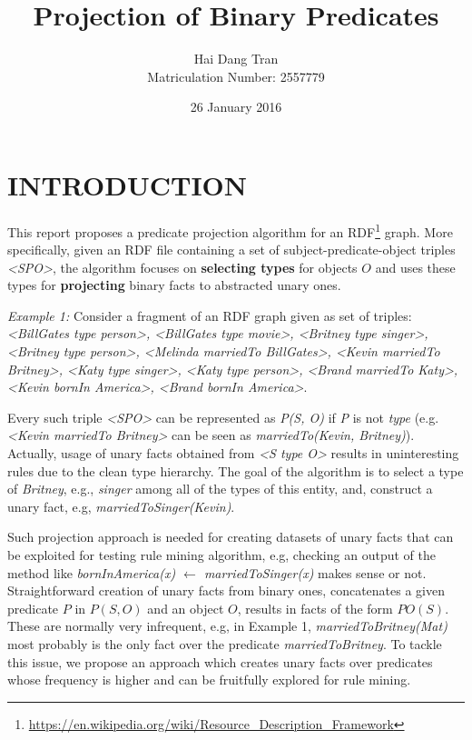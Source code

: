 \documentclass{acm_proc_article-sp}
\begin{document}
\title{Projection of Binary Predicates}
\author{
\alignauthor
Hai Dang Tran\\Matriculation Number: 2557779
}
\date{26 January 2016}

\maketitle

\section{INTRODUCTION}
This report proposes a predicate projection algorithm for an RDF\footnote{\url{https://en.wikipedia.org/wiki/Resource_Description_Framework}} graph. More specifically, given an RDF file containing a set of subject-predicate-object triples \textit{<SPO>}, the algorithm focuses on \textbf{selecting types} for objects $O$ and uses these types for \textbf{projecting} binary facts to abstracted unary ones.

\textit{Example 1:} Consider a fragment of an RDF graph given as set of triples: \textit{<BillGates type person>, <BillGates type movie>, <Britney type singer>, <Britney type person>, <Melinda marriedTo BillGates>, <Kevin marriedTo Britney>, <Katy type singer>, <Katy type person>, <Brand marriedTo Katy>, <Kevin bornIn America>, <Brand bornIn America>}.

Every such triple \textit{<SPO>} can be represented as \textit{P(S, O)} if \textit{P} is not \textit{type} (e.g. \textit{<Kevin marriedTo Britney>} can be seen as \textit{marriedTo(Kevin, Britney)}). Actually, usage of unary facts obtained from \textit{<S type O>} results in uninteresting rules due to the clean type hierarchy. The goal of the algorithm is to select a type of \textit{Britney}, e.g., \textit{singer} among all of the types of this entity, and, construct a unary fact, e.g, \textit{marriedToSinger(Kevin)}.

Such projection approach is needed for creating datasets of unary facts that can be exploited for testing rule mining algorithm, e.g, checking an output of the method like \textit{bornInAmerica(x) $\leftarrow$ marriedToSinger(x)} makes sense or not. Straightforward creation of unary facts from binary ones, concatenates a given predicate $P$ in $P(S, O)$ and an object $O$, results in facts of the form $PO(S)$. These are normally very infrequent, e.g, in Example 1, \textit{marriedToBritney(Mat)} most probably is the only fact over the predicate \textit{marriedToBritney}.  To tackle this issue, we propose an approach which creates unary facts over predicates whose frequency is higher and can be fruitfully explored for rule mining.
\end{document}
